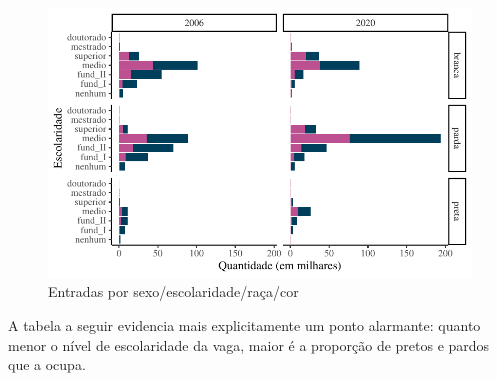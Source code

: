 \documentclass[
  12pt,
  letterpaper,
  DIV=11,
  numbers=noendperiod]{scrartcl}
\begin{document}
\begin{figure}

{\centering \includegraphics[width=1\textwidth,height=\textheight]{monografia_files/figure-pdf/entradas por sexo/escolaridade/raca-1.pdf}

}

\caption{Entradas por sexo/escolaridade/raça/cor}

\end{figure}

A tabela a seguir evidencia mais explicitamente um ponto alarmante:
quanto menor o nível de escolaridade da vaga, maior é a proporção de
pretos e pardos que a ocupa.
\end{document}
